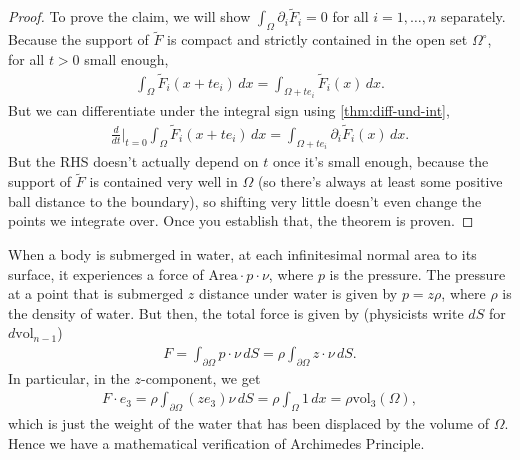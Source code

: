 \begin{proof}
	To prove the claim, we will show $ \int_{\Omega} \partial_{i}\tilde{F}_{i} = 0$ for all $i = 1, \dots, n$ separately. Because the support of $\tilde{F}$ is compact and strictly contained in the open set $ \Omega^{\circ }$, for all $t > 0$ small enough,
	\begin{align*}
		\int_{\Omega} \tilde{F}_{i}(x + t e_{i}) \, dx = \int_{\Omega + t e_{i}} \tilde{F}_{i}(x) \, dx.
	\end{align*}
	But we can differentiate under the integral sign using \ref{thm:diff-und-int},
	\begin{align*}
		\frac{d}{dt} \Big|_{t=0} \int_{\Omega} \tilde{F}_{i}(x + te_{i}) \, dx = \int_{\Omega+t e_{i}} \partial_{i} \tilde{F}_{i}(x) \, dx.
	\end{align*}
	But the RHS doesn't actually depend on $t$ once it's small enough, because the support of $\tilde{F}$ is contained very well in $\Omega$ (so there's always at least some positive ball distance to the boundary), so shifting very little doesn't even change the points we integrate over. Once you establish that, the theorem is proven.
\end{proof}

\begin{eg}
	When a body is submerged in water, at each infinitesimal normal area to its surface, it experiences a force of $\text{Area} \cdot p \cdot \nu$, where $p$ is the pressure. The pressure at a point that is submerged $z$ distance under water is given by $p = z \rho$, where $\rho$ is the density of water. But then, the total force is given by (physicists write $dS$ for $d \text{vol}_{n-1}$)
	\begin{align*}
		F = \int_{\partial \Omega} p \cdot \nu \, dS = \rho\int_{\partial\Omega} z \cdot \nu \, dS.
	\end{align*}
	In particular, in the $z$-component, we get
	\begin{align*}
		F \cdot e_{3} = \rho \int_{\partial \Omega} (z e_{3}) \nu \, dS = \rho \int_{\Omega} 1 \, dx = \rho \text{vol}_{3}(\Omega),
	\end{align*}
	which is just the weight of the water that has been displaced by the volume of $\Omega$. Hence we have a mathematical verification of Archimedes Principle.
\end{eg}

